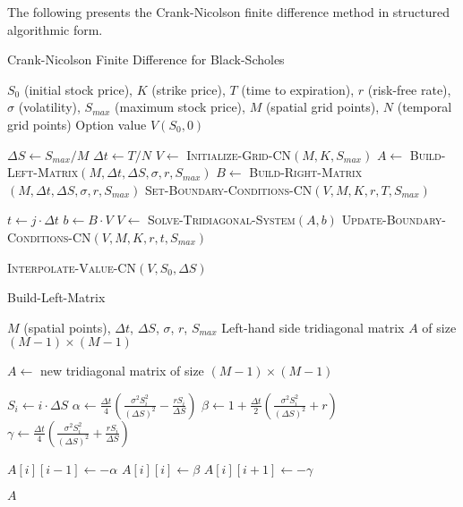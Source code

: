 \documentclass[12pt,a4paper]{article}
\numberwithin{algorithm}{subsection}
\begin{document}
The following presents the Crank-Nicolson finite difference method in structured algorithmic form.

\begin{algorithm}[H]
\caption{Crank-Nicolson Finite Difference for Black-Scholes}
\begin{algorithmic}[1]
\REQUIRE $S_0$ (initial stock price), $K$ (strike price), $T$ (time to expiration), $r$ (risk-free rate), $\sigma$ (volatility), $S_{max}$ (maximum stock price), $M$ (spatial grid points), $N$ (temporal grid points)
\ENSURE Option value $V(S_0, 0)$

\STATE $\Delta S \leftarrow S_{max} / M$
\STATE $\Delta t \leftarrow T / N$
\STATE $V \leftarrow$ \textsc{Initialize-Grid-CN}$(M, K, S_{max})$
\STATE $A \leftarrow$ \textsc{Build-Left-Matrix}$(M, \Delta t, \Delta S, \sigma, r, S_{max})$
\STATE $B \leftarrow$ \textsc{Build-Right-Matrix}$(M, \Delta t, \Delta S, \sigma, r, S_{max})$
\STATE \textsc{Set-Boundary-Conditions-CN}$(V, M, K, r, T, S_{max})$

    \STATE $t \leftarrow j \cdot \Delta t$
    \STATE $b \leftarrow B \cdot V$ 
    \STATE $V \leftarrow$ \textsc{Solve-Tridiagonal-System}$(A, b)$
    \STATE \textsc{Update-Boundary-Conditions-CN}$(V, M, K, r, t, S_{max})$
\ENDFOR

\RETURN \textsc{Interpolate-Value-CN}$(V, S_0, \Delta S)$
\end{algorithmic}
\end{algorithm}

\begin{algorithm}[H]
\caption{Build-Left-Matrix}
\begin{algorithmic}[1]
\REQUIRE $M$ (spatial points), $\Delta t$, $\Delta S$, $\sigma$, $r$, $S_{max}$
\ENSURE Left-hand side tridiagonal matrix $A$ of size $(M-1) \times (M-1)$

\STATE $A \leftarrow$ new tridiagonal matrix of size $(M-1) \times (M-1)$

    \STATE $S_i \leftarrow i \cdot \Delta S$
    \STATE $\alpha \leftarrow \frac{\Delta t}{4} \left( \frac{\sigma^2 S_i^2}{(\Delta S)^2} - \frac{rS_i}{\Delta S} \right)$
    \STATE $\beta \leftarrow 1 + \frac{\Delta t}{2} \left( \frac{\sigma^2 S_i^2}{(\Delta S)^2} + r \right)$
    \STATE $\gamma \leftarrow \frac{\Delta t}{4} \left( \frac{\sigma^2 S_i^2}{(\Delta S)^2} + \frac{rS_i}{\Delta S} \right)$
    
        \STATE $A[i][i-1] \leftarrow -\alpha$ 
    \ENDIF
    \STATE $A[i][i] \leftarrow \beta$ 
        \STATE $A[i][i+1] \leftarrow -\gamma$ 
    \ENDIF
\ENDFOR

\RETURN $A$
\end{algorithmic}
\end{algorithm}
\end{document}
